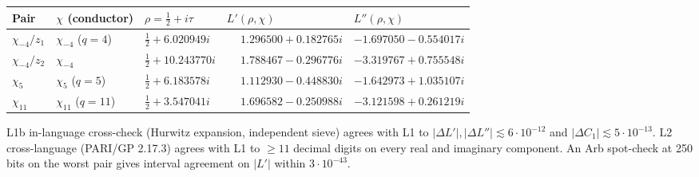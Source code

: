 {\def\LTcaptype{none} %
\begin{longtable}[]{@{}
  >{\raggedright\arraybackslash}p{}
  >{\raggedright\arraybackslash}p{}
  >{\raggedright\arraybackslash}p{}
  >{\raggedright\arraybackslash}p{}
  >{\raggedright\arraybackslash}p{}@{}}
\toprule\noalign{}
\begin{minipage}[b]{\linewidth}\raggedright
Pair
\end{minipage} & \begin{minipage}[b]{\linewidth}\raggedright
\(\chi\) (conductor)
\end{minipage} & \begin{minipage}[b]{\linewidth}\raggedright
\(\rho = \tfrac12 + i\tau\)
\end{minipage} & \begin{minipage}[b]{\linewidth}\raggedright
\(L'(\rho,\chi)\)
\end{minipage} & \begin{minipage}[b]{\linewidth}\raggedright
\(L''(\rho,\chi)\)
\end{minipage} \\
\midrule\noalign{}
\endhead
\bottomrule\noalign{}
\endlastfoot
\(\chi_{-4}/z_1\) & \(\chi_{-4}\) (\(q = 4\)) & \(\tfrac12 + 6.020949 i\) & \(\phantom{-}1.296500 + 0.182765 i\) & \(-1.697050 - 0.554017 i\) \\
\(\chi_{-4}/z_2\) & \(\chi_{-4}\) & \(\tfrac12 + 10.243770 i\) & \(\phantom{-}1.788467 - 0.296776 i\) & \(-3.319767 + 0.755548 i\) \\
\(\chi_5\) & \(\chi_5\) (\(q = 5\)) & \(\tfrac12 + 6.183578 i\) & \(\phantom{-}1.112930 - 0.448830 i\) & \(-1.642973 + 1.035107 i\) \\
\(\chi_{11}\) & \(\chi_{11}\) (\(q = 11\)) & \(\tfrac12 + 3.547041 i\) & \(\phantom{-}1.696582 - 0.250988 i\) & \(-3.121598 + 0.261219 i\) \\
\end{longtable}
}

L1b in-language cross-check (Hurwitz expansion, independent sieve)
agrees with L1 to \(|\Delta L'|, |\Delta L''| \lesssim 6 \cdot 10^{-12}\)
and \(|\Delta C_1| \lesssim 5 \cdot 10^{-13}\). L2 cross-language (PARI/GP
2.17.3) agrees with L1 to \(\ge 11\) decimal digits on every real and
imaginary component. An Arb spot-check at 250 bits on the worst pair
gives interval agreement on \(|L'|\) within \(3 \cdot 10^{-43}\).

